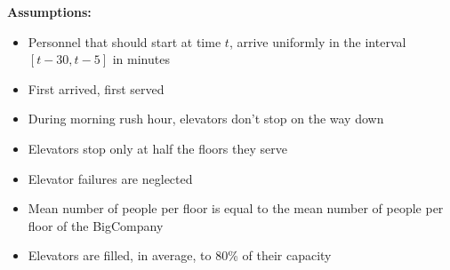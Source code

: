 \textbf{Assumptions:}
\begin{itemize}
	\item Personnel that should start at time $t$, arrive uniformly in the interval $[t-30, t-5]$ in minutes
	\item First arrived, first served
	\item During morning rush hour, elevators don't stop on the way down
	\item Elevators stop only at half the floors they serve
	\item Elevator failures are neglected
	\item Mean number of people per floor is equal to the mean number of people per floor of the BigCompany
	\item Elevators are filled, in average, to 80\% of their capacity
\end{itemize}

